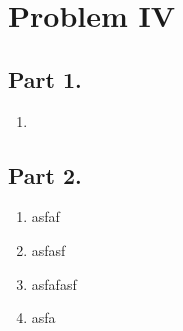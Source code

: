 \documentclass[letterpaper,11pt,twoside]{article}
\begin{document}
\section*{Problem IV}

\subsection*{Part 1.}
\begin{enumerate}[itemsep=0pt,topsep=0pt,label=\alph*)]
  \item 
\end{enumerate}

\subsection*{Part 2.}
\begin{enumerate}[itemsep=0pt,topsep=0pt,label=\alph*),start=2]
  \item asfaf
  \item asfasf
  \item asfafasf
  \item asfa
\end{enumerate}




%
\end{document}
